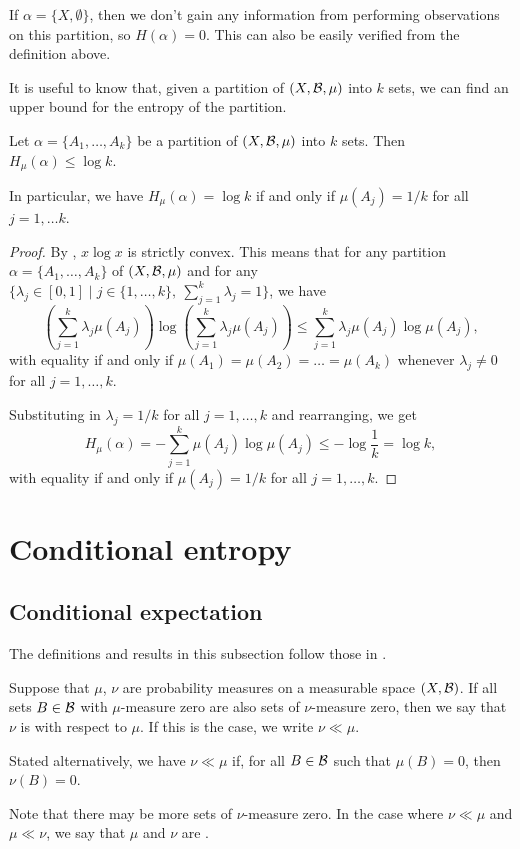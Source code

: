 \begin{remark}
	If $\alpha = \{X, \emptyset\}$, then we don't gain any information from performing observations on this partition, so $H(\alpha) = 0$. This can also be easily verified from the definition above.
\end{remark}

It is useful to know that, given a partition of $(X, \mathcal{B}, \mu)$ into $k$ sets, we can find an upper bound for the entropy of the partition.

\begin{proposition} \label{prop:walters-cor-4-2-1}
	Let $\alpha = \{A_1, \dots, A_k\}$ be a partition of $(X, \mathcal{B}, \mu)$ into $k$ sets. Then $H_\mu(\alpha) \leq \log{k}$.
	
	In particular, we have $H_\mu(\alpha) = \log{k}$ if and only if $\mu(A_j) = 1 / k$ for all $j = 1, \dots k$.
	
	\begin{proof}
		By , $x \log{x}$ is strictly convex. This means that for any partition $\alpha = \{A_1, \dots, A_k\}$ of $(X, \mathcal{B}, \mu)$ and for any $\{\lambda_j \in [0, 1] \mid j \in \{1, \dots, k\},\ \sum_{j = 1}^k{\lambda_j} = 1\}$, we have
		\[
			\left(\sum_{j = 1}^k{\lambda_j \mu(A_j)}\right) \log{\left(\sum_{j = 1}^k{\lambda_j \mu(A_j)}\right)} \leq \sum_{j = 1}^k{\lambda_j \mu(A_j) \log{\mu(A_j)}},
		\]
		with equality if and only if $\mu(A_1) = \mu(A_2) = \dots = \mu(A_k)$ whenever $\lambda_j \neq 0$ for all $j = 1, \dots, k$.
		
		Substituting in $\lambda_j = 1 / k$ for all $j = 1, \dots, k$ and rearranging, we get
		\[
			H_\mu(\alpha) = -\sum_{j = 1}^k{\mu(A_j) \log{\mu(A_j)}} \leq -\log{\frac{1}{k}} = \log{k},
		\]
		with equality if and only if $\mu(A_j) = 1 / k$ for all $j = 1, \dots, k$.
	\end{proof}
\end{proposition}

\section{Conditional entropy}
\subsection{Conditional expectation}
The definitions and results in this subsection follow those in \cite[p8-9]{walters:intro-to-ergodic-theory}.
\begin{definition}
	Suppose that $\mu$, $\nu$ are probability measures on a measurable space $(X, \mathcal{B})$. If all sets $B \in \mathcal{B}$ with $\mu$-measure zero are also sets of $\nu$-measure zero, then we say that $\nu$ is  with respect to $\mu$. If this is the case, we write $\nu \ll \mu$.
	
	Stated alternatively, we have $\nu \ll \mu$ if, for all $B \in \mathcal{B}$ such that $\mu(B) = 0$, then $\nu(B) = 0$.
	
	Note that there may be more sets of $\nu$-measure zero. In the case where $\nu \ll \mu$ and $\mu \ll \nu$, we say that $\mu$ and $\nu$ are .
\end{definition}

